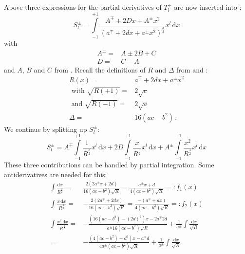 Above three expressions for the partial derivatives of $T^{\pm}_l$ are now inserted into :
\begin{equation}
  S^{\pm}_l = \int\limits_{-1}^{+1} \frac{A^{\mp} + 2 D x + A^{\pm} x^2}
              {\left( a^{\mp}+2 d x + a^{\pm} x^2 \right)^{\frac{3}{2}}} x^l \,\mathrm{d}x \label{eqn:int_S_pm_l}
\end{equation}
with
\begin{align}
  A^{\pm} =& A \pm 2B + C \\
  D =& C - A
\end{align}
and $A$, $B$ and $C$ from .
Recall the definitions of $R$ and $\Delta$ from  and :
\begin{align}
                        R(x)   =& a^{\mp}+2 d x + a^{\pm} x^2 \nonumber \\
  \textrm{ with } \sqrt{R(+1)} =& 2 \sqrt{c} \nonumber \\
  \textrm{ and }  \sqrt{R(-1)} =& 2 \sqrt{a} \nonumber \\
                        \Delta =& 16 (ac - b^2) \nonumber \, .
\end{align}
We continue by splitting up $S^{\pm}_l$:
\begin{equation}
    S^{\pm}_l
  = A^{\mp} \int\limits_{-1}^{+1}
              \frac{1}{R^{\frac{3}{2}}} x^l \,\mathrm{d}x
  + 2 D     \int\limits_{-1}^{+1}
              \frac{x}{R^{\frac{3}{2}}} x^l \,\mathrm{d}x
  + A^{\pm} \int\limits_{-1}^{+1}
              \frac{x^2}{R^{\frac{3}{2}}} x^l \,\mathrm{d}x \label{eqn:S_from_ints}
\end{equation}
These three contributions can be handled by partial integration.
Some antiderivatives are needed for this:
\begin{align}
  \int \frac{      \mathrm{d}x}{R^\frac{3}{2}} =&  \frac{2(2a^{\pm} x + 2 d)}{16\left(ac-b^2\right) \sqrt{R}} = \frac{a^{\pm}x + d}{4\left(ac-b^2\right)\sqrt{R}} =: f_1(x)\label{eqn:GR_2_264_5} \\
  \int \frac{x   \,\mathrm{d}x}{R^\frac{3}{2}} =& -\frac{2(2a^{\mp} + 2 d x)}{16\left(ac-b^2\right) \sqrt{R}} = \frac{-(a^{\mp} + d x)}{4\left(ac-b^2\right)\sqrt{R}} =: f_2(x) \label{eqn:GR_2_264_6} \\
  \int \frac{x^2 \,\mathrm{d}x}{R^\frac{3}{2}} =& -\frac{\left(16\left(ac-b^2\right)-(2d)^2\right)x-2a^{\mp}2d}{a^{\pm}16\left(ac-b^2\right)\sqrt{R}} +\frac{1}{a^{\pm}} \int \frac{\mathrm{d}x}{\sqrt{R}} \nonumber \\
   ~                                           =& -\frac{\left(4\left(ac-b^2\right)-d^2\right)x-a^{\mp}d}{4 a^{\pm}\left(ac-b^2\right)\sqrt{R}} +\frac{1}{a^{\pm}} \int \frac{\mathrm{d}x}{\sqrt{R}} \label{eqn:GR_2_264_7}
\end{align}
